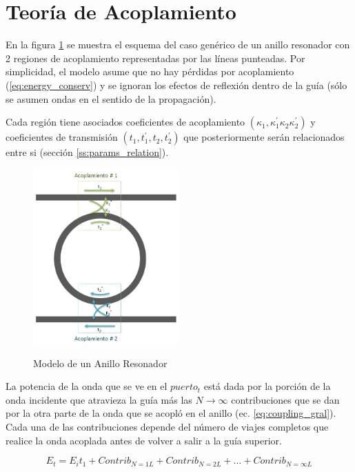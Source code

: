 \section{Teoría de Acoplamiento}\cite{yariv2006photonics}
\label{coupling_theory}

En la figura \ref{fig:rr_model} se muestra el esquema del caso genérico de un anillo resonador con 2 regiones de acoplamiento representadas por las líneas punteadas. 
Por simplicidad, el modelo asume que no hay pérdidas por 
acoplamiento (\ref{eq:energy_conserv}) y se ignoran los efectos de reflexión 
dentro de la guía (sólo se asumen ondas en el sentido de la propagación). 

Cada región tiene asociados 
coeficientes de acoplamiento $(\kappa_1,\kappa_1^{'}\kappa_2\kappa_2^{'})$ y
coeficientes de transmisión $(t_1, t_1^{'}, t_2, t_2^{'})$ que posteriormente
serán relacionados entre si (sección \ref{ss:params_relation}).


\begin{figure}[h!]
\caption{Modelo de un Anillo Resonador}
\centering
\includegraphics[width=0.5\textwidth,natwidth=559,natheight=668]{figs/rr_model.jpg}
\label{fig:rr_model}
\end{figure} 


La potencia de la onda que se ve en el $puerto_t$ está dada por la porción de la onda incidente
que atravieza la guía más las $N\to\infty$ contribuciones que se dan por la otra parte de la
onda que se acopló en el anillo (ec. \ref{eq:coupling_gral}). 
Cada una de las contribuciones depende del número de viajes completos que realice la onda
acoplada antes de volver a salir a la guía superior.


\begin{equation}
E_t = E_i t_1 + Contrib_{N=1L} + Contrib_{N=2L} + ... + Contrib_{N=\infty L}
\label{eq:coupling_gral}
\end{equation} 

